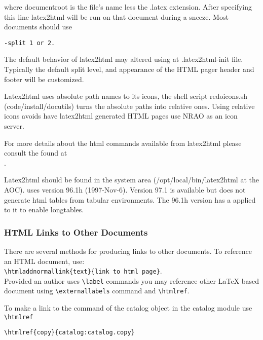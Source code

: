 where documentroot is the file's name less the .latex extension.  After
specifying this line 
latex2html will be run on that document during a sneeze.  Most \aips documents
should use
\begin{verbatim}
-split 1 or 2.
\end{verbatim}


The default behavior of latex2html may altered using at .latex2html-init
file.  Typically the default split level, and appearance of the HTML pager
header and footer will be customized.

Latex2html uses absolute path names to its icons, the shell script
redoicons.sh (code/install/docutils) turns the absolute paths into relative
ones.  Using relative icons avoids have latex2html generated HTML pages
use NRAO as an icon server.

For more details about the html commands available from latex2html please 
consult the
found at\\ 
.

Latex2html should be found in the system area (/opt/local/bin/latex2html at the
AOC).  \aips  uses version 96.1h (1997-Nov-6).  Version 97.1 is available but
does not generate html tables from tabular environments.  The 96.1h version
has a  applied to it to
enable longtables.  

\subsubsection{HTML Links to Other Documents}
There are several methods for producing links to other documents.  To
reference an HTML document, use:\\
\verb!\htmladdnormallink{text}{link to html page}!.\\
Provided an author uses
\verb!\label! commands you may reference other 
LaTeX based document using 
\verb!\externallabels! command and \verb!\htmlref!.

To make a link to the  command of the
catalog object in the catalog module use \verb!\htmlref!
\begin{verbatim}
\htmlref{copy}{catalog:catalog.copy}
\end{verbatim}

